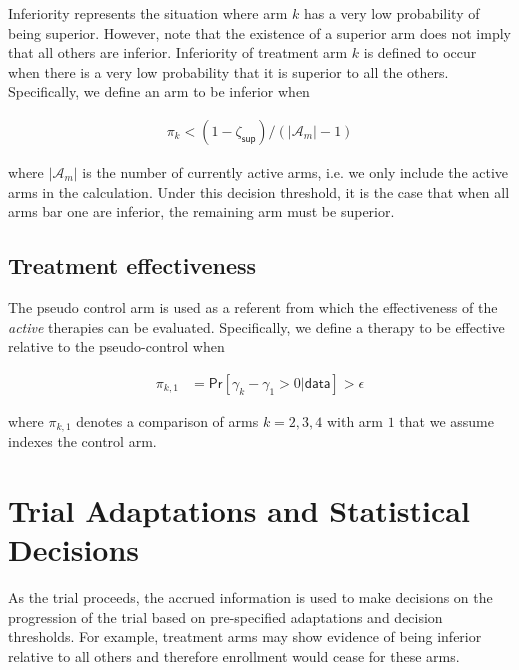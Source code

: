 \documentclass[
]{article}
\begin{document}
Inferiority represents the situation where arm $k$ has a very low probability of being superior.
However, note that the existence of a superior arm does not imply that all others are inferior.
Inferiority of treatment arm $k$ is defined to occur when there is a very low probability that it is superior to all the others.
Specifically, we define an arm to be inferior when

\[
\begin{aligned}
\pi_{k} < (1 - \zeta_{\mathsf{sup}}) / (|\mathcal{A}_m| - 1)
\end{aligned}
\]

where $|\mathcal{A}_m|$ is the number of currently active arms, i.e. we only include the active arms in the calculation.
Under this decision threshold, it is the case that when all arms bar one are inferior, the remaining arm must be superior.

\hypertarget{treatment-effectiveness}{%
\subsection{Treatment effectiveness}\label{treatment-effectiveness}}

The pseudo control arm is used as a referent from which the effectiveness of the \textit{active} therapies can be evaluated.
Specifically, we define a therapy to be effective relative to the pseudo-control when

\[
\begin{aligned}
\pi_{k,1} &= \mathsf{Pr}[\gamma_{k} - \gamma_{1} >0|\mathsf{data}] > \epsilon
\end{aligned}
\]

where $\pi_{k,1}$ denotes a comparison of arms $k = 2, 3, 4$ with arm $1$ that we assume indexes the control arm.

\clearpage

\hypertarget{trial-adaptations-and-statistical-decisions}{%
\section{Trial Adaptations and Statistical Decisions}\label{trial-adaptations-and-statistical-decisions}}

As the trial proceeds, the accrued information is used to make decisions on the progression of the trial based on pre-specified adaptations and decision thresholds.
For example, treatment arms may show evidence of being inferior relative to all others and therefore enrollment would cease for these arms.
\end{document}

